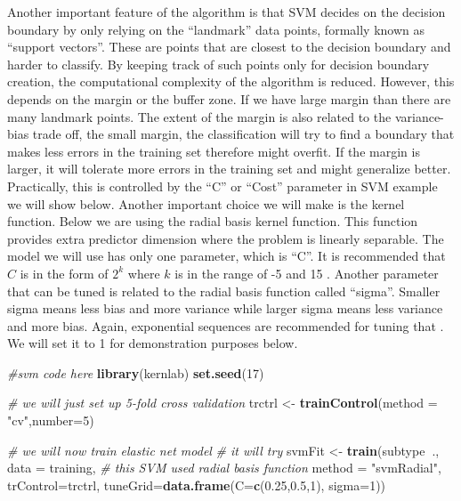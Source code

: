 \documentclass[12pt,]{krantz}
\newenvironment{Shaded}{\begin{snugshade}}{\end{snugshade}}
\newcommand{\CommentTok}[1]{\textcolor[rgb]{0.56,0.35,0.01}{\textit{#1}}}
\newcommand{\DataTypeTok}[1]{\textcolor[rgb]{0.13,0.29,0.53}{#1}}
\newcommand{\DecValTok}[1]{\textcolor[rgb]{0.00,0.00,0.81}{#1}}
\newcommand{\FloatTok}[1]{\textcolor[rgb]{0.00,0.00,0.81}{#1}}
\newcommand{\KeywordTok}[1]{\textcolor[rgb]{0.13,0.29,0.53}{\textbf{#1}}}
\newcommand{\NormalTok}[1]{#1}
\newcommand{\OperatorTok}[1]{\textcolor[rgb]{0.81,0.36,0.00}{\textbf{#1}}}
\newcommand{\StringTok}[1]{\textcolor[rgb]{0.31,0.60,0.02}{#1}}
\begin{document}
Another important feature of the algorithm is that SVM decides on the decision boundary by only relying on the ``landmark'' data points, formally known as ``support vectors''. These are points that are closest to the decision boundary and harder to classify. By keeping track of such points only for decision boundary creation, the computational complexity of the algorithm is reduced. However, this depends on the margin or the buffer zone. If we have large margin than there are many landmark points. The extent of the margin is also related to the variance-bias trade off, the small margin, the classification will try to find a boundary that makes less errors in the training set therefore might overfit. If the margin is larger, it will tolerate more errors in the training set and might generalize better. Practically, this is controlled by the ``C'' or ``Cost'' parameter in SVM example we will show below. Another important choice we will make is the kernel function. Below we are using the radial basis kernel function. This function provides extra predictor dimension where the problem is linearly separable. The model we will use has only one parameter, which is ``C''. It is recommended that \(C\) is in the form of \(2^k\) where \(k\) is in the range of -5 and 15 \citep{hsu2003practical}. Another parameter that can be tuned is related to the radial basis function called ``sigma''. Smaller sigma means less bias and more variance while larger sigma means less variance and more bias. Again, exponential sequences are recommended for tuning that \citep{hsu2003practical}. We will set it to 1 for demonstration purposes below.

\begin{Shaded}
\begin{Highlighting}[]
\CommentTok{#svm code here}
\KeywordTok{library}\NormalTok{(kernlab)}
\KeywordTok{set.seed}\NormalTok{(}\DecValTok{17}\NormalTok{)}

\CommentTok{# we will just set up 5-fold cross validation}
\NormalTok{trctrl <-}\StringTok{ }\KeywordTok{trainControl}\NormalTok{(}\DataTypeTok{method =} \StringTok{"cv"}\NormalTok{,}\DataTypeTok{number=}\DecValTok{5}\NormalTok{)}

\CommentTok{# we will now train elastic net model}
\CommentTok{# it will try}
\NormalTok{svmFit <-}\StringTok{ }\KeywordTok{train}\NormalTok{(subtype}\OperatorTok{~}\NormalTok{., }\DataTypeTok{data =}\NormalTok{ training, }
                \CommentTok{# this SVM used radial basis function}
                 \DataTypeTok{method =} \StringTok{"svmRadial"}\NormalTok{, }
                 \DataTypeTok{trControl=}\NormalTok{trctrl,}
                \DataTypeTok{tuneGrid=}\KeywordTok{data.frame}\NormalTok{(}\DataTypeTok{C=}\KeywordTok{c}\NormalTok{(}\FloatTok{0.25}\NormalTok{,}\FloatTok{0.5}\NormalTok{,}\DecValTok{1}\NormalTok{),}
                                    \DataTypeTok{sigma=}\DecValTok{1}\NormalTok{))}
\end{Highlighting}
\end{Shaded}
\end{document}
